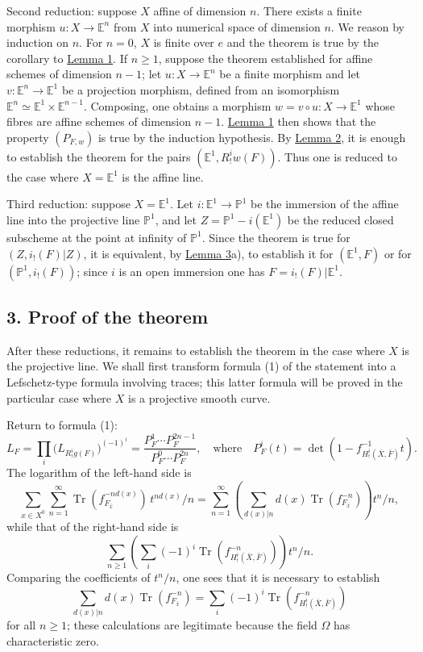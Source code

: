 \documentclass[11pt]{article}
\providecommand{\Tr}{\operatorname{Tr}}
\providecommand{\Tr}{\operatorname{Tr}}
\providecommand{\Tr}{\operatorname{Tr}}
\providecommand{\Tr}{\operatorname{Tr}}
\providecommand{\Tr}{\operatorname{Tr}}
\begin{document}
Second reduction: suppose $X$ affine of dimension $n$. There exists a finite morphism $u:X\to\mathbb E^n$ from $X$ into numerical space of dimension $n$. We reason by induction on $n$. For $n=0$, $X$ is finite over $e$ and the theorem is true by the corollary to \hyperref[sga5:XV:lemma:1]{Lemma 1}. If $n\ge1$, suppose the theorem established for affine schemes of dimension $n-1$; let $u:X\to\mathbb E^n$ be a finite morphism and let $v:\mathbb E^n\to\mathbb E^1$ be a projection morphism, defined from an isomorphism $\mathbb E^n\simeq\mathbb E^1\times\mathbb E^{n-1}$. Composing, one obtains a morphism $w=v\circ u:X\to\mathbb E^1$ whose fibres are affine schemes of dimension $n-1$. \hyperref[sga5:XV:lemma:1]{Lemma 1} then shows that the property $(P_{F,w})$ is true by the induction hypothesis. By \hyperref[sga5:XV:lemma:2]{Lemma 2}, it is enough to establish the theorem for the pairs $(\mathbb E^1,R^i_!w(F))$. Thus one is reduced to the case where $X=\mathbb E^1$ is the affine line.

Third reduction: suppose $X=\mathbb E^1$. Let $i:\mathbb E^1\to\mathbb P^1$ be the immersion of the affine line into the projective line $\mathbb P^1$, and let $Z=\mathbb P^1-i(\mathbb E^1)$ be the reduced closed subscheme at the point at infinity of $\mathbb P^1$. Since the theorem is true for $(Z,i_!(F)|Z)$, it is equivalent, by \hyperref[sga5:XV:lemma:3]{Lemma 3}a), to establish it for $(\mathbb E^1,F)$ or for $(\mathbb P^1,i_!(F))$; since $i$ is an open immersion one has $F=i_!(F)|\mathbb E^1$.

\subsection*{3. Proof of the theorem}\label{sga5:XV:subsection:3:2}

After these reductions, it remains to establish the theorem in the case where $X$ is the projective line. We shall first transform formula (1) of the statement into a Lefschetz-type formula involving traces; this latter formula will be proved in the particular case where $X$ is a projective smooth curve.

Return to formula (1):
\[
L_F=\prod_i\bigl(L_{R^i_!g(F)}\bigr)^{(-1)^i}
=\frac{P_F^1\cdots P_F^{2n-1}}{P_F^0\cdots P_F^{2n}},
\quad\text{where}\quad
P_F^i(t)=\det(1-f^{-1}_{H^i_!(\bar X,\bar F)}t).
\]
The logarithm of the left-hand side is
\[
\sum_{x\in X^0}\sum_{n=1}^{\infty}\Tr(f_{F_{\bar x}}^{-n d(x)})\,t^{n d(x)}/n
=\sum_{n=1}^{\infty}\left(\sum_{d(x)|n} d(x)\Tr(f_{F_{\bar x}}^{-n})\right)t^n/n,
\]
while that of the right-hand side is
\[
\sum_{n\ge1}\left(\sum_i(-1)^i\Tr(f^{-n}_{H^i_!(\bar X,\bar F)})\right)t^n/n.
\]
Comparing the coefficients of $t^n/n$, one sees that it is necessary to establish
\[
\sum_{d(x)|n}d(x)\Tr(f_{F_{\bar x}}^{-n})
=\sum_i(-1)^i\Tr(f^{-n}_{H^i_!(\bar X,\bar F)})
\tag{2}\label{sga5:XV:equation:2}
\]
for all $n\ge1$; these calculations are legitimate because the field $\Omega$ has characteristic zero.
\end{document}
